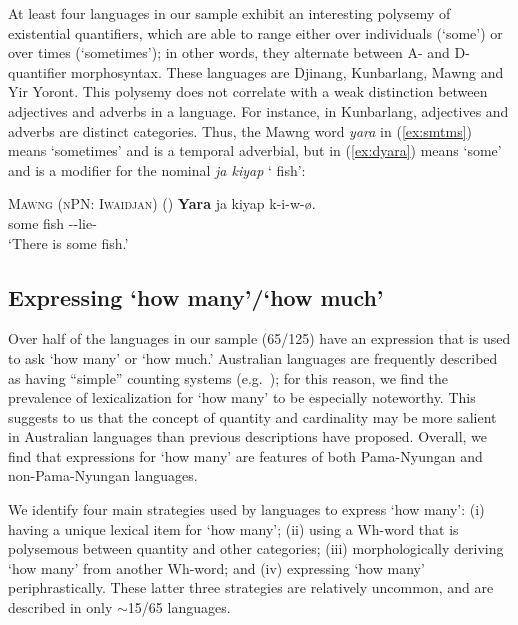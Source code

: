 \documentclass[12pt,egregdoesnotlikesansseriftitles]{scrartcl}
\makeatletter
\newcommand{\ofy}{/125} %
\makeatother
\begin{document}
At least four languages in our sample exhibit an interesting polysemy of existential quantifiers, which are able to range either over individuals (`some') or over times (`sometimes'); in other words, they alternate between A- and D-quantifier morphosyntax. These languages are Djinang, Kunbarlang, Mawng and Yir Yoront. This polysemy does not correlate with a weak distinction between adjectives and adverbs in a language. For instance, in Kunbarlang, adjectives and adverbs are distinct categories. Thus, the Mawng word \textit{yara} in (\ref{ex:smtms}) means `sometimes' and is a temporal adverbial, but in (\ref{ex:dyara}) means `some' and is a modifier for the nominal \textit{ja kiyap} `\Clm{} fish':
\begin{exe}
  \ex\label{ex:dyara} \textsc{Mawng (nPN: Iwaidjan)} \hfill (\citealt{ngaralk})
  \gll \textbf{Yara} ja kiyap k-i-w-ø.\\
  some \Clm{} fish \Prs-\Tsg\Clm-lie-\Np\\
  \glt `There is some fish.' %
\end{exe}



\subsection{Expressing `how many'/`how much'
\label{sec:howmany}}

Over half of the languages in our sample (65\ofy) have an expression that is used to ask `how many' or `how much.' Australian languages are frequently described as having ``simple'' counting systems (e.g.\ \citealt[67]{dixon02}); for this reason, we find the prevalence  of lexicalization for `how many' to be especially noteworthy. This suggests to us that the concept of quantity and cardinality may be more salient in Australian languages than previous descriptions have proposed. Overall, we find that expressions for `how many' are features of both Pama-Nyungan and non-Pama-Nyungan languages.

We identify four main strategies used by languages to express `how many': (i) having a unique lexical item for `how many'; (ii) using a Wh-word that is polysemous between quantity and other categories; (iii) morphologically deriving `how many' from another Wh-word; and (iv) expressing `how many' periphrastically. These latter three strategies are relatively uncommon, and are described in only $\sim$15/65 languages. 
\end{document}
